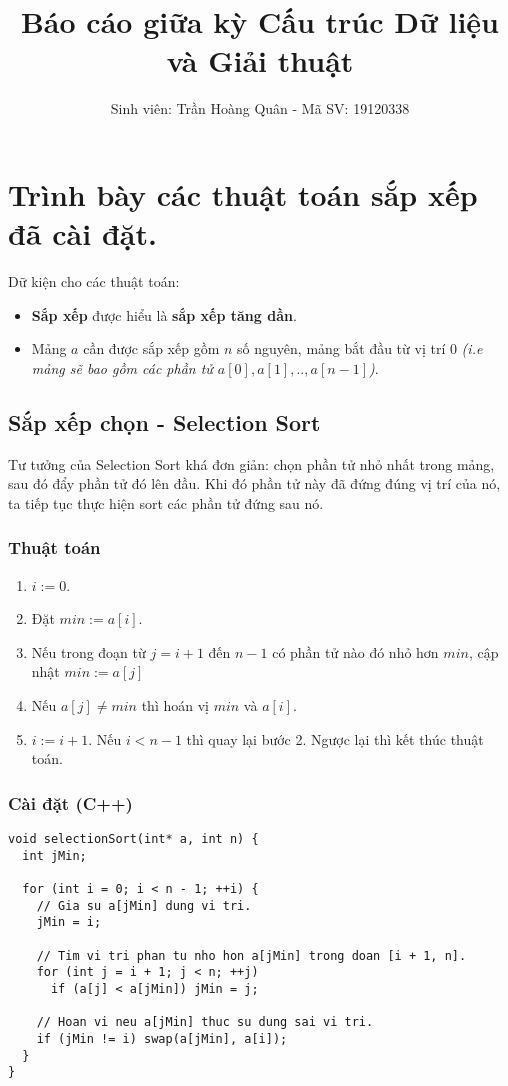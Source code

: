 \documentclass[]{article}
\title{Báo cáo giữa kỳ Cấu trúc Dữ liệu và Giải thuật}
\author{Sinh viên: Trần Hoàng Quân - Mã SV: 19120338}
\begin{document}
\maketitle
\tableofcontents
\pagebreak

\section{Trình bày các thuật toán sắp xếp đã cài đặt.}
Dữ kiện cho các thuật toán:
\begin{itemize}
\item \textbf{Sắp xếp} được hiểu là \textbf{sắp xếp tăng dần}.
\item Mảng $a$ cần được sắp xếp gồm $n$ số nguyên, mảng bắt đầu từ vị trí 0 \textit{(i.e mảng sẽ bao gồm các phần tử $a[0], a[1], .., a[n - 1]$)}.
\end{itemize}
\subsection{Sắp xếp chọn - Selection Sort}
Tư tưởng của Selection Sort khá đơn giản: chọn phần tử nhỏ nhất trong mảng, sau đó đẩy phần tử đó lên đầu. Khi đó phần tử này đã đứng đúng vị trí của nó, ta tiếp tục thực hiện sort các phần tử đứng sau nó.
\subsubsection{Thuật toán}
\begin{enumerate}
\item $i := 0$.
\item Đặt $min := a[i]$.
\item Nếu trong đoạn từ $j = i + 1$ đến $n - 1$ có phần tử nào đó nhỏ hơn $min$, cập nhật $min := a[j]$
\item Nếu $a[j] \neq min$ thì hoán vị $min$ và $a[i]$.
\item $i := i + 1$. Nếu $i < n - 1$ thì quay lại bước 2. Ngược lại thì kết thúc thuật toán.
\end{enumerate}

\subsubsection{Cài đặt (C++)}
\begin{lstlisting}
void selectionSort(int* a, int n) {
  int jMin;

  for (int i = 0; i < n - 1; ++i) {
    // Gia su a[jMin] dung vi tri.
    jMin = i;

    // Tim vi tri phan tu nho hon a[jMin] trong doan [i + 1, n].
    for (int j = i + 1; j < n; ++j)
      if (a[j] < a[jMin]) jMin = j;

    // Hoan vi neu a[jMin] thuc su dung sai vi tri.
    if (jMin != i) swap(a[jMin], a[i]);
  }
}
\end{lstlisting}
\end{document}
